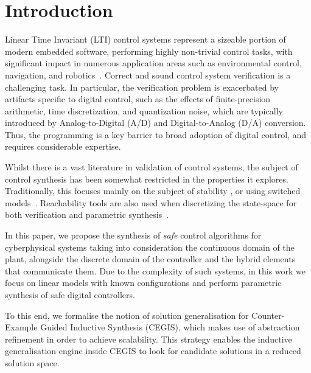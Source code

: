 \documentclass[runningheads,a4paper]{llncs}
\begin{document}
\section{Introduction}

Linear Time Invariant (LTI) control systems represent a sizeable portion of
modern embedded software, performing highly non-trivial control tasks,
with significant impact in numerous application areas such as
environmental control, navigation, and 
robotics~\cite{astrom1997computer,Franklin15}.
Correct and sound control system verification is a challenging task. 
In particular, the verification problem is exacerbated by artifacts specific 
to digital control, such as the effects of finite-precision arithmetic, 
time discretization, and quantization noise, which are typically introduced 
by Analog-to-Digital (A/D) and Digital-to-Analog (D/A) conversion.  
Thus, the programming is a key barrier to broad adoption of digital control, 
and requires considerable expertise.

Whilst there is a vast literature in validation of control systems,
the subject of control synthesis has been somewhat restricted in the
properties it explores.  Traditionally, this focuses mainly on the
subject of stability %
\cite{sadabadi2016static,DBLP:journals/corr/AbateBCCDKK16}, or using switched
models~\cite{DBLP:conf/emsoft/RavanbakhshS16}.
Reachability tools are
also used when discretizing the state-space for both verification and
parametric synthesis~\cite{cimatti2013parameter}.

In this paper, we propose the synthesis of \emph{safe} control algorithms for
cyberphysical systems taking into consideration the continuous domain
of the plant, alongside the discrete domain of the controller and the
hybrid elements that communicate them.
%
Due to the complexity of such systems, in this work we focus
on linear models with known configurations and perform parametric synthesis
of safe digital controllers.

To this end, we formalise the notion of solution generalisation for
Counter-Example Guided Inductive Synthesis (CEGIS), which makes use 
of abstraction refinement
in order to achieve scalability.
This strategy enables the inductive generalisation engine inside CEGIS
to look for candidate solutions in a reduced solution space.  %
\end{document}
